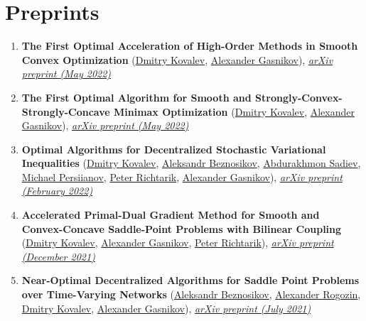 \section{Preprints}
\begin{enumerate}
\item \textbf{The First Optimal Acceleration of High-Order Methods in Smooth Convex Optimization} (\href{https://www.dmitry-kovalev.com}{\color{linkcolour}Dmitry Kovalev}, \href{https://scholar.google.ru/citations?user=AmeE8qkAAAAJ}{\color{linkcolour}Alexander Gasnikov}), \href{https://arxiv.org/abs/2205.09647}{\em \color{black}arXiv preprint (May 2022)}
\item \textbf{The First Optimal Algorithm for Smooth and Strongly-Convex-Strongly-Concave Minimax Optimization} (\href{https://www.dmitry-kovalev.com}{\color{linkcolour}Dmitry Kovalev}, \href{https://scholar.google.ru/citations?user=AmeE8qkAAAAJ}{\color{linkcolour}Alexander Gasnikov}), \href{https://arxiv.org/abs/2205.05653}{\em \color{black}arXiv preprint (May 2022)}
\item \textbf{Optimal Algorithms for Decentralized Stochastic Variational Inequalities} (\href{https://www.dmitry-kovalev.com}{\color{linkcolour}Dmitry Kovalev}, \href{https://anbeznosikov.github.io}{\color{linkcolour}Aleksandr Beznosikov}, \href{https://scholar.google.com/citations?user=R-xZRIAAAAAJ&hl=ru}{\color{linkcolour}Abdurakhmon Sadiev}, \href{}{\color{linkcolour}Michael Persiianov}, \href{https://richtarik.org}{\color{linkcolour}Peter Richtarik}, \href{https://scholar.google.ru/citations?user=AmeE8qkAAAAJ}{\color{linkcolour}Alexander Gasnikov}), \href{https://arxiv.org/abs/2202.02771}{\em \color{black}arXiv preprint (February 2022)}
\item \textbf{Accelerated Primal-Dual Gradient Method for Smooth and Convex-Concave Saddle-Point Problems with Bilinear Coupling} (\href{https://www.dmitry-kovalev.com}{\color{linkcolour}Dmitry Kovalev}, \href{https://scholar.google.ru/citations?user=AmeE8qkAAAAJ}{\color{linkcolour}Alexander Gasnikov}, \href{https://richtarik.org}{\color{linkcolour}Peter Richtarik}), \href{https://arxiv.org/abs/2112.15199}{\em \color{black}arXiv preprint (December 2021)}
\item \textbf{Near-Optimal Decentralized Algorithms for Saddle Point Problems over Time-Varying Networks} (\href{https://anbeznosikov.github.io}{\color{linkcolour}Aleksandr Beznosikov}, \href{https://scholar.google.com/citations?user=sEjyzkgAAAAJ}{\color{linkcolour}Alexander Rogozin}, \href{https://www.dmitry-kovalev.com}{\color{linkcolour}Dmitry Kovalev}, \href{https://scholar.google.ru/citations?user=AmeE8qkAAAAJ}{\color{linkcolour}Alexander Gasnikov}), \href{https://arxiv.org/abs/2107.05957}{\em \color{black}arXiv preprint (July 2021)}

\end{enumerate}

